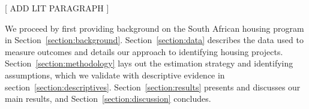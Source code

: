 \documentclass[12pt]{article}
\begin{document}
[ ADD LIT PARAGRAPH ]

We proceed by first providing background on the South African housing program in Section~\ref{section:background}. 
Section~\ref{section:data} describes the data used to measure outcomes and details our approach to identifying housing projects. Section~\ref{section:methodology} lays out the estimation strategy and identifying assumptions, which we validate with descriptive evidence in section~\ref{section:descriptives}. Section~\ref{section:results} presents and discusses our main results, and  Section~\ref{section:discussion} concludes.





\end{document}
